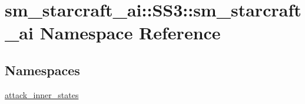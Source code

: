 \hypertarget{namespacesm__starcraft__ai_1_1SS3_1_1sm__starcraft__ai}{}\section{sm\+\_\+starcraft\+\_\+ai\+:\+:S\+S3\+:\+:sm\+\_\+starcraft\+\_\+ai Namespace Reference}
\label{namespacesm__starcraft__ai_1_1SS3_1_1sm__starcraft__ai}
\subsection*{Namespaces}
\begin{DoxyCompactItemize}
\item 
 \hyperlink{namespacesm__starcraft__ai_1_1SS3_1_1sm__starcraft__ai_1_1attack__inner__states}{attack\+\_\+inner\+\_\+states}
\end{DoxyCompactItemize}
